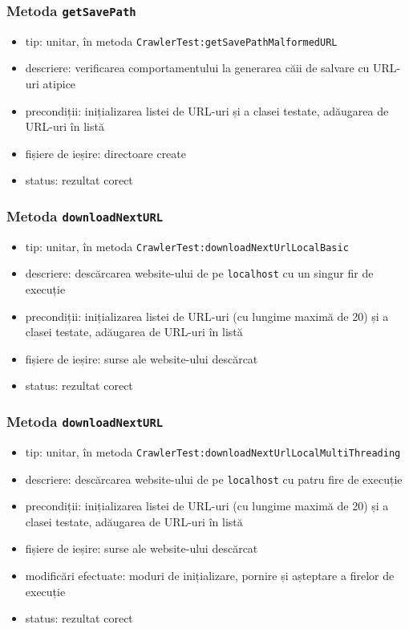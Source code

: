 \documentclass[12pt]{article}
\begin{document}
\subsubsection{Metoda \texttt{getSavePath}}

\begin{itemize}
    \item tip: unitar, în metoda \texttt{CrawlerTest:getSavePathMalformedURL}
    \item descriere: verificarea comportamentului la generarea căii de salvare cu URL-uri atipice
    \item precondiții: inițializarea listei de URL-uri și a clasei testate, adăugarea de URL-uri în listă
    \item fișiere de ieșire: directoare create
    \item status: rezultat corect
\end{itemize}

\subsubsection{Metoda \texttt{downloadNextURL}}

\begin{itemize}
    \item tip: unitar, în metoda \texttt{CrawlerTest:downloadNextUrlLocalBasic}
    \item descriere: descărcarea website-ului de pe \texttt{localhost} cu un singur fir de execuție
    \item precondiții: inițializarea listei de URL-uri (cu lungime maximă de 20) și a clasei testate, adăugarea de URL-uri în listă
    \item fișiere de ieșire: surse ale website-ului descărcat
    \item status: rezultat corect
\end{itemize}

\subsubsection{Metoda \texttt{downloadNextURL}}

\begin{itemize}
    \item tip: unitar, în metoda \texttt{CrawlerTest:downloadNextUrlLocalMultiThreading}
    \item descriere: descărcarea website-ului de pe \texttt{localhost} cu patru fire de execuție
    \item precondiții: inițializarea listei de URL-uri (cu lungime maximă de 20) și a clasei testate, adăugarea de URL-uri în listă
    \item fișiere de ieșire: surse ale website-ului descărcat
    \item modificări efectuate: moduri de inițializare, pornire și așteptare a firelor de execuție
    \item status: rezultat corect
\end{itemize}
\end{document}

